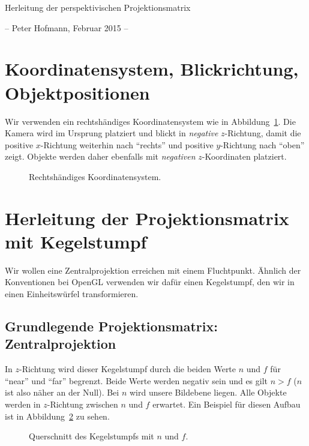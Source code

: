 \documentclass[a4paper,parskip=full*]{scrartcl}
\begin{document}
\begin{Huge}
	\begin{center}
		Herleitung der perspektivischen Projektionsmatrix
	\end{center}
\end{Huge}

\begin{center}
	-- Peter Hofmann, Februar 2015 --
\end{center}

\tableofcontents

\section{Koordinatensystem, Blickrichtung, Objektpositionen}
Wir verwenden ein rechtshändiges Koordinatensystem wie in
Abbildung~\ref{coord}. Die Kamera wird im Ursprung platziert und
blickt in \emph{negative} $z$-Richtung, damit die positive $x$-Richtung
weiterhin nach "`rechts"' und positive $y$-Richtung nach "`oben"' zeigt.
Objekte werden daher ebenfalls mit \emph{negativen} $z$-Koordinaten
platziert.

\begin{figure}[h]
	\centering
	
	\caption%
	{Rechtshändiges Koordinatensystem.}

	\label{coord}
\end{figure}

\section{Herleitung der Projektionsmatrix mit Kegelstumpf}
Wir wollen eine Zentralprojektion erreichen mit einem Fluchtpunkt.
Ähnlich der Konventionen bei OpenGL verwenden wir dafür einen
Kegelstumpf, den wir in einen Einheitswürfel transformieren.

\subsection{Grundlegende Projektionsmatrix: Zentralprojektion}
In $z$-Richtung wird dieser Kegelstumpf durch die beiden Werte $n$ und
$f$ für "`near"' und "`far"' begrenzt. Beide Werte werden negativ sein
und es gilt $n > f$ ($n$ ist also näher an der Null). Bei $n$ wird
unsere Bildebene liegen. Alle Objekte werden in $z$-Richtung zwischen
$n$ und $f$ erwartet. Ein Beispiel für diesen Aufbau ist in
Abbildung~\ref{frustumz} zu sehen.

\begin{figure}[h]
	\centering
	
	\caption%
	{Querschnitt des Kegelstumpfs mit $n$ und $f$.}

	\label{frustumz}
\end{figure}
\end{document}
